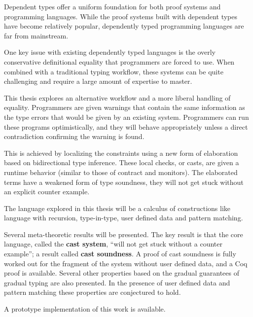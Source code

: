 Dependent types offer a uniform foundation for both proof systems and programming languages.
While the proof systems built with dependent types have become relatively popular, dependently typed programming languages are far from mainstream.

One key issue with existing dependently typed languages is the overly conservative definitional equality that programmers are forced to use.
When combined with a traditional typing workflow, these systems can be quite challenging and require a large amount of expertise to master.

This thesis explores an alternative workflow and a more liberal handling of equality.
Programmers are given warnings that contain the same information as the type errors that would be given by an existing system.
Programmers can run these programs optimistically, and they will behave appropriately unless a direct contradiction confirming the warning is found.

This is achieved by localizing the constraints using a new form of elaboration based on bidirectional type inference.
These local checks, or casts, are given a runtime behavior (similar to those of contract and monitors).
The elaborated terms have a weakened form of type soundness, they will not get stuck without an explicit counter example.

The language explored in this thesis will be a calculus of constructions like language with recursion, type-in-type, user defined data and pattern matching.

Several meta-theoretic results will be presented.
The key result is that the core language, called the \textbf{cast system}, ``will not get stuck without a counter example''; a result called \textbf{cast soundness}.
A proof of cast soundness is fully worked out for the fragment of the system without user defined data, and a Coq proof is available. Several other properties based on the gradual guarantees of gradual typing are also presented.
In the presence of user defined data and pattern matching these properties are conjectured to hold.

A prototype implementation of this work is available.

